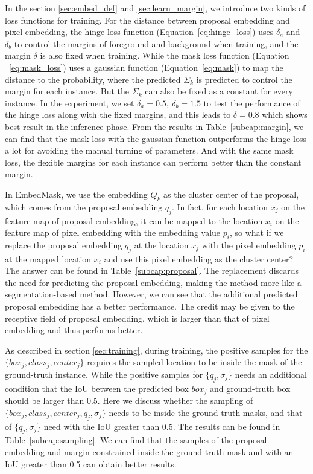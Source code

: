 \documentclass[10pt,twocolumn,letterpaper]{article}
\begin{document}
\medbreak
{}
In the section \ref{sec:embed_def} and \ref{sec:learn_margin}, we introduce two kinds of loss functions for training. 
For the distance between proposal embedding and pixel embedding, the hinge loss function (Equation~\ref{eq:hinge_loss}) uses $\delta_a$ and $\delta_b$ to control the margins of foreground and background when training, and the margin $\delta$ is also fixed when training. 
While the mask loss function (Equation ~\ref{eq:mask_loss}) uses a gaussian function (Equation~\ref{eq:mask}) to map the distance to the probability, where the predicted $\Sigma_k$ is predicted to control the margin for each instance. 
But the $\Sigma_k$ can also be fixed as a constant for every instance. 
In the experiment, we set $\delta_a=0.5,\ \delta_b=1.5$ to test the performance of the hinge loss along with the fixed margins, and this leads to $\delta=0.8$ which shows best result in the inference phase. 
From the results in Table~\ref{subcap:margin}, we can find that the mask loss with the gaussian function outperforms the hinge loss a lot for avoiding the manual turning of parameters. And with the same mask loss, the flexible margins for each instance can perform better than the constant margin. 


\medbreak
{}
In EmbedMask, we use the embedding $Q_k$ as the cluster center of the proposal, which comes from the proposal embedding $q_j$. 
In fact, for each location $x_j$ on the feature map of proposal embedding, it can be mapped to the location $x_i$ on the feature map of pixel embedding with the embedding value $p_i$, so what if we replace the proposal embedding $q_j$ at the location $x_j$ with the pixel embedding $p_i$ at the mapped location $x_i$ and use this pixel embedding as the cluster center? 
The answer can be found in Table~\ref{subcap:proposal}. 
The replacement discards the need for predicting the proposal embedding, making the method more like a segmentation-based method. 
However, we can see that the additional predicted proposal embedding has a better performance. 
The credit may be given to the receptive field of proposal embedding, which is larger than that of pixel embedding and thus performs better.

\medbreak
{}
As described in section \ref{sec:training}, during training, the positive samples for the $\{box_j, class_j, center_j\}$ requires the sampled location to be inside the mask of the ground-truth instance. 
While the positive samples for $\{q_j, \sigma_j\}$ needs an additional condition that the IoU between the predicted box $box_j$ and ground-truth box should be larger than 0.5. 
Here we discuss whether the sampling of $\{box_j, class_j, center_j, q_j, \sigma_j\}$ needs to be inside the ground-truth masks, and that of $\{q_j, \sigma_j\}$ need with the IoU greater than 0.5. 
The results can be found in Table~\ref{subcap:sampling}. 
We can find that the samples of the proposal embedding and margin constrained inside the ground-truth mask and with an IoU greater than 0.5 can obtain better results.
\end{document}
